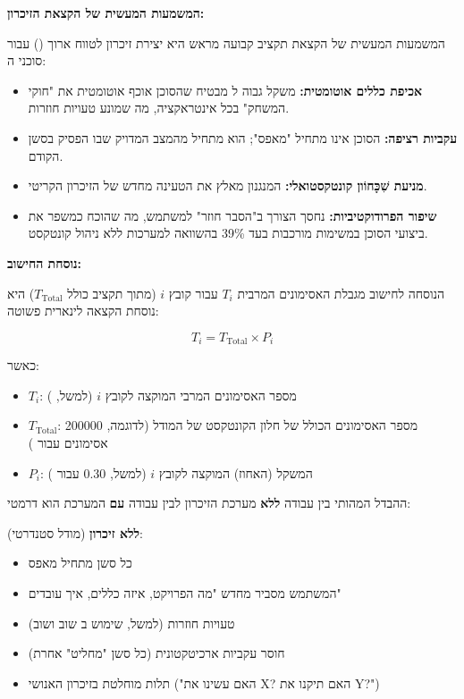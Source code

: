 \textbf{המשמעות המעשית של הקצאת הזיכרון:}

המשמעות המעשית של הקצאת תקציב קבועה מראש היא יצירת זיכרון לטווח ארוך () עבור סוכני ה:
\begin{itemize}
  \item \textbf{אכיפת כללים אוטומטית:} משקל גבוה ל מבטיח שהסוכן אוכף אוטומטית את "חוקי המשחק" בכל אינטראקציה, מה שמונע טעויות חוזרות.
  \item \textbf{עקביות רציפה:} הסוכן אינו מתחיל "מאפס"; הוא מתחיל מהמצב המדויק שבו הפסיק בסשן הקודם.
  \item \textbf{מניעת שִׁכָּחוֹון קונטקסטואלי:} המנגנון מאלץ את הטעינה מחדש של הזיכרון הקריטי.
  \item \textbf{שיפור הפרודוקטיביות:} נחסך הצורך ב"הסבר חוזר" למשתמש, מה שהוכח כמשפר את ביצועי הסוכן במשימות מורכבות בעד \num{39}\% בהשוואה למערכות ללא ניהול קונטקסט.
\end{itemize}

\textbf{נוסחת החישוב:}

הנוסחה לחישוב מגבלת האסימונים המרבית $T_i$ עבור קובץ $i$ (מתוך תקציב כולל $T_{\text{Total}}$) היא נוסחת הקצאה לינארית פשוטה:

$$T_i = T_{\text{Total}} \times P_i$$

כאשר:
\begin{itemize}
  \item $T_i$: מספר האסימונים המרבי המוקצה לקובץ $i$ (למשל, )
  \item $T_{\text{Total}}$: מספר האסימונים הכולל של חלון הקונטקסט של המודל (לדוגמה, \num{200000} אסימונים עבור )
  \item $P_i$: המשקל (האחוז) המוקצה לקובץ $i$ (למשל, \num{0.30} עבור )
\end{itemize}


ההבדל המהותי בין עבודה \textbf{ללא} מערכת הזיכרון לבין עבודה \textbf{עם} המערכת הוא דרמטי:

\textbf{ללא זיכרון} (מודל סטנדרטי):
\begin{itemize}
  \item כל סשן מתחיל מאפס
  \item המשתמש מסביר מחדש "מה הפרויקט, איזה כללים, איך עובדים"
  \item טעויות חוזרות (למשל, שימוש ב שוב ושוב)
  \item חוסר עקביות ארכיטקטונית (כל סשן "מחליט" אחרת)
  \item תלות מוחלטת בזיכרון האנושי ("האם עשינו את X? האם תיקנו את Y?")
\end{itemize}

